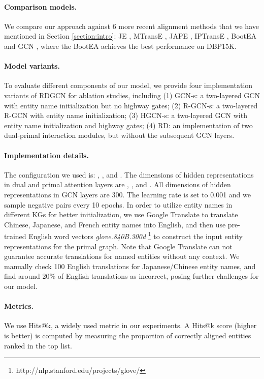 \documentclass{article}
\begin{document}
\paragraph{Comparison models.} We compare our approach against 6 more recent alignment methods that we have mentioned in Section \ref{section:intro}:
JE \cite{hao2016joint}, MTransE \cite{chen2016multilingual}, JAPE \cite{sun2017cross}, IPTransE \cite{zhu2017iterative},
BootEA \cite{sun2018bootstrapping} and GCN \cite{wang2018cross}, where the BootEA achieves the best performance on DBP15K.

\paragraph{Model variants.} To evaluate different components of our model, we provide four implementation
variants of RDGCN for ablation studies, including (1) GCN-s: a two-layered GCN with entity name 
initialization but no highway gates; (2) R-GCN-s: a two-layered R-GCN \cite{schlichtkrull2018modeling} with entity name
initialization; (3) HGCN-s: a two-layered GCN with entity name initialization and highway gates; (4) RD: an implementation of two dual-primal interaction modules, but without the subsequent GCN layers.

\paragraph{Implementation details.}
The configuration we used is: , , and . The dimensions of hidden representations in dual and primal attention layers are , , and . All dimensions of hidden representations in GCN layers are 300. The learning rate is set to 0.001 and we sample  negative pairs every 10 epochs.
In order to utilize entity names in different KGs for better initialization, we use Google Translate to translate Chinese,
Japanese, and French entity names into English, and then use pre-trained English word vectors
\emph{glove.840B.300d} \footnote{http://nlp.stanford.edu/projects/glove/} to construct the input entity representations for the primal graph. Note that Google Translate can not guarantee accurate translations for named entities without any context. We manually check 100 English translations for Japanese/Chinese entity names, and find around 20\% of English translations as incorrect,
posing further challenges for our model. 

\paragraph{Metrics.} We use Hits@k, a widely used metric \cite{sun2018bootstrapping,wang2018cross} in
our experiments. A Hits@k score (higher is better) is computed by measuring the proportion of correctly aligned entities ranked in the top  list.
\end{document}
